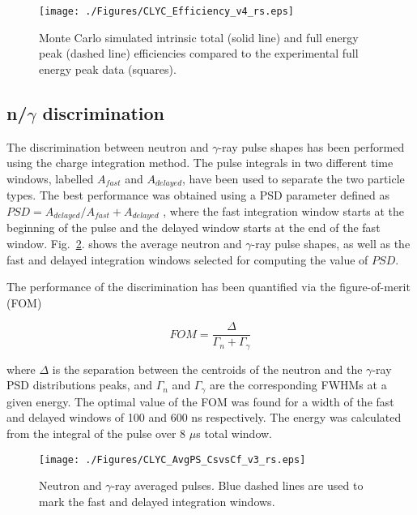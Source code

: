 \documentclass[review,number,sort&compress]{elsarticle}
\begin{document}
\begin{figure}[h!]
\centering
\texttt{[image: ./Figures/CLYC\_Efficiency\_v4\_rs.eps]}
\caption{Monte Carlo simulated intrinsic total (solid line) and full energy peak (dashed line) efficiencies compared to the experimental full energy peak data (squares).}
\label{efficiency}
\end{figure}

\subsection{n/$\gamma$ discrimination}

The discrimination between neutron and $\gamma$-ray pulse shapes has been performed using the charge integration method. The pulse integrals in two different time windows, labelled $A_{fast}$ and $A_{delayed}$, have been used to separate the two particle types. The best performance was obtained using a PSD parameter defined as $PSD={A_{delayed}}/{A_{fast}+A_{delayed}}$ \cite{Lee}, where the fast integration window starts at the beginning of the pulse and the delayed window starts at the end of the fast window. Fig.~\ref{pulseshape}. shows the average neutron and $\gamma$-ray pulse shapes, as well as the fast and delayed integration windows selected for computing the value of $PSD$. 

The performance of the discrimination has been quantified via the figure-of-merit (FOM)

\begin{equation}
FOM=\dfrac{\Delta}{\Gamma_{n}+\Gamma_{\gamma}}
\end{equation}

where $\Delta$ is the separation between the centroids of the neutron and the $\gamma$-ray PSD distributions peaks, and $\Gamma_{n}$ and $\Gamma_{\gamma}$ are the corresponding FWHMs at a given energy. The optimal value of the FOM was found for a width of the fast and delayed windows of 100 and 600 ns respectively. The energy was calculated from the integral of the pulse over 8 $\mu$s total window.

\begin{figure}[h!]
\centering
\texttt{[image: ./Figures/CLYC\_AvgPS\_CsvsCf\_v3\_rs.eps]}
\caption{Neutron and $\gamma$-ray averaged pulses. Blue dashed lines are used to mark the fast and delayed integration windows.}
\label{pulseshape}
\end{figure}
\end{document}
